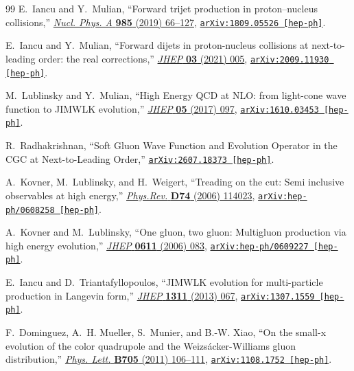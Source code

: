 \begin{thebibliography}{99}
E.~Iancu and Y.~Mulian, ``{Forward trijet production in proton--nucleus
  collisions},'' \href{http://dx.doi.org/10.1016/j.nuclphysa.2019.02.003}{{\em
  Nucl. Phys. A} {\bf 985} (2019)  66--127},
  \href{http://arxiv.org/abs/1809.05526}{{\tt arXiv:1809.05526 [hep-ph]}}.

E.~Iancu and Y.~Mulian, ``{Forward dijets in proton-nucleus collisions at
  next-to-leading order: the real corrections},''
  \href{http://dx.doi.org/10.1007/JHEP03(2021)005}{{\em JHEP} {\bf 03} (2021)
  005}, \href{http://arxiv.org/abs/2009.11930}{{\tt arXiv:2009.11930
  [hep-ph]}}.

M.~Lublinsky and Y.~Mulian, ``{High Energy QCD at NLO: from light-cone wave
  function to JIMWLK evolution},''
  \href{http://dx.doi.org/10.1007/JHEP05(2017)097}{{\em JHEP} {\bf 05} (2017)
  097},
\href{http://arxiv.org/abs/1610.03453}{{\tt arXiv:1610.03453 [hep-ph]}}.

R.~Radhakrishnan, ``{Soft Gluon Wave Function and Evolution Operator in the CGC at Next-to-Leading Order},'' \href{http://arxiv.org/abs/2607.18373}{{\tt arXiv:2607.18373 [hep-ph]}}.

A.~Kovner, M.~Lublinsky, and H.~Weigert, ``{Treading on the cut: Semi inclusive
  observables at high energy},''
  \href{http://dx.doi.org/10.1103/PhysRevD.74.114023}{{\em Phys.Rev.} {\bf D74}
  (2006)  114023},
\href{http://arxiv.org/abs/hep-ph/0608258}{{\tt arXiv:hep-ph/0608258
  [hep-ph]}}.

A.~Kovner and M.~Lublinsky, ``{One gluon, two gluon: Multigluon production via
  high energy evolution},''
  \href{http://dx.doi.org/10.1088/1126-6708/2006/11/083}{{\em JHEP} {\bf 0611}
  (2006)  083},
\href{http://arxiv.org/abs/hep-ph/0609227}{{\tt arXiv:hep-ph/0609227
  [hep-ph]}}.

E.~Iancu and D.~Triantafyllopoulos, ``{JIMWLK evolution for multi-particle
  production in Langevin form},''
  \href{http://dx.doi.org/10.1007/JHEP11(2013)067}{{\em JHEP} {\bf 1311} (2013)
   067},
\href{http://arxiv.org/abs/1307.1559}{{\tt arXiv:1307.1559 [hep-ph]}}.

F.~Dominguez, A.~H. Mueller, S.~Munier, and B.-W. Xiao, ``{On the small-x
  evolution of the color quadrupole and the Weizs\'acker-Williams gluon
  distribution},'' \href{http://dx.doi.org/10.1016/j.physletb.2011.09.104}{{\em
  Phys. Lett.} {\bf B705} (2011)  106--111},
\href{http://arxiv.org/abs/1108.1752}{{\tt arXiv:1108.1752 [hep-ph]}}.


\end{thebibliography}

